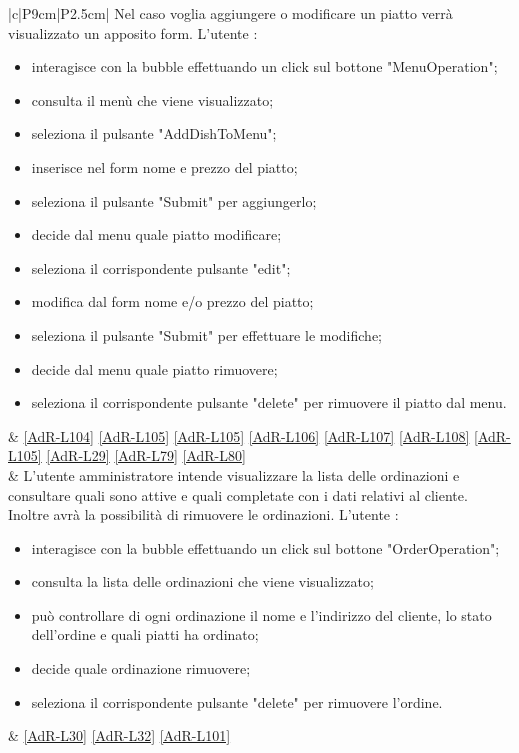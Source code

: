\begin{longtable}{|c|P{9cm}|P{2.5cm}|}
	Nel caso voglia aggiungere o modificare un piatto verrà visualizzato un apposito form. L'utente :
	\begin{itemize}
		\item interagisce con la bubble effettuando un click sul bottone "MenuOperation";
		\item consulta il menù che viene visualizzato; 
		\item seleziona il pulsante "AddDishToMenu";
		\item inserisce nel form nome e prezzo del piatto;
		\item seleziona il pulsante "Submit" per aggiungerlo;
		\item decide dal menu quale piatto modificare;
		\item seleziona il corrispondente pulsante "edit";
		\item modifica dal form nome e/o prezzo del piatto;
		\item seleziona il pulsante "Submit" per effettuare le modifiche;
		\item decide dal menu quale piatto rimuovere;
		\item seleziona il corrispondente pulsante "delete" per rimuovere il piatto dal menu.
	\end{itemize}
	& \ref{AdR-L104} \ref{AdR-L105} \ref{AdR-L105} \ref{AdR-L106} \ref{AdR-L107} \ref{AdR-L108} \ref{AdR-L105} \ref{AdR-L29} \ref{AdR-L79} \ref{AdR-L80} \\
	\hline {} & L'utente amministratore intende visualizzare la lista delle ordinazioni e consultare quali sono attive e quali completate con i dati relativi al cliente. Inoltre avrà la possibilità di rimuovere le ordinazioni. L'utente :
	\begin{itemize}
		\item interagisce con la bubble effettuando un click sul bottone "OrderOperation";
		\item consulta la lista delle ordinazioni che viene visualizzato; 
		\item può controllare di ogni ordinazione il nome e l'indirizzo del cliente, lo stato dell'ordine e quali piatti ha ordinato;
		\item decide quale ordinazione rimuovere;
		\item seleziona il corrispondente pulsante "delete" per rimuovere l'ordine.
	\end{itemize}
	& \ref{AdR-L30} \ref{AdR-L32} \ref{AdR-L101} \\
	\hline
	\caption{Test di validazione}
\end{longtable}

